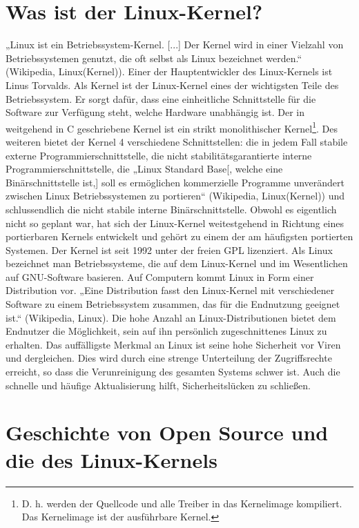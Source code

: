 \documentclass[a4paper,12pt]{article}
\begin{document}
\section{Was ist der Linux-Kernel?}%
„Linux ist ein Betriebssystem-Kernel. [...] Der Kernel wird in einer Vielzahl von Betriebssystemen genutzt, die oft selbst als Linux bezeichnet werden.“ (Wikipedia, Linux(Kernel)). Einer der Hauptentwickler des Linux-Kernels ist Linus Torvalds. Als Kernel ist der Linux-Kernel eines der wichtigsten Teile des Betriebssystem. Er sorgt dafür, dass eine einheitliche Schnittstelle für die Software zur Verfügung steht, welche Hardware unabhängig ist. Der in weitgehend in C geschriebene Kernel ist ein strikt monolithischer Kernel\footnote{D. h. werden der Quellcode und alle Treiber in das Kernelimage kompiliert. Das Kernelimage ist der ausführbare Kernel.}. Des weiteren bietet der Kernel 4 verschiedene Schnittstellen: die in jedem Fall stabile externe Programmierschnittstelle, die nicht stabilitätsgarantierte interne Programmierschnittstelle, die „Linux Standard Base[, welche eine Binärschnittstelle ist,] soll es ermöglichen kommerzielle Programme unverändert zwischen Linux Betriebssystemen zu portieren“ (Wikipedia, Linux(Kernel)) und schlussendlich die nicht stabile interne Binärschnittstelle. Obwohl es eigentlich nicht so geplant war, hat sich der Linux-Kernel weitestgehend in Richtung eines portierbaren Kernels entwickelt und gehört zu einem der am häufigsten portierten Systemen. Der Kernel ist seit 1992 unter der freien GPL lizenziert.
Als Linux bezeichnet man Betriebssysteme, die auf dem Linux-Kernel und im Wesentlichen auf GNU-Software basieren. Auf Computern kommt Linux in Form einer Distribution vor. „Eine Distribution fasst den Linux-Kernel mit verschiedener Software zu einem Betriebssystem zusammen, das für die Endnutzung geeignet ist.“ (Wikipedia, Linux). Die hohe Anzahl an Linux-Distributionen bietet dem Endnutzer die Möglichkeit, sein auf ihn persönlich zugeschnittenes Linux zu erhalten. Das auffälligste Merkmal an Linux ist seine hohe Sicherheit vor Viren und dergleichen. Dies wird durch eine strenge Unterteilung der Zugriffsrechte erreicht, so dass die Verunreinigung des gesamten Systems schwer ist. Auch die schnelle und häufige Aktualisierung hilft, Sicherheitslücken zu schließen.
\newpage
\section{Geschichte von Open Source und die des Linux-Kernels}
\end{document}
